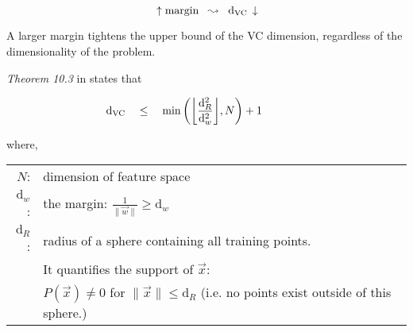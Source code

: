 \begin{frame}

\slidesonly{\vspace{-5mm}} 

\\

\slidesonly{\vspace{-5mm}} 

\begin{equation}
\, \uparrow \text{margin} \;\; \leadsto \;\; \mathrm{d}_{\mathrm{VC}} \, \downarrow   
\end{equation}


A larger margin tightens the upper bound of the VC dimension, regardless of the dimensionality of the problem. 

\begin{block}{\textit{Theorem 10.3} in \citep{Vapnik1998}}
states that

\begin{equation}
    \mathrm{d}_{\mathrm{VC}} \quad\leq\quad \min \bigg( \bigg\lfloor 
    \frac{\mathrm{d}_R^2}{\mathrm{d}_{{w}}^2}
\bigg\rfloor, N \bigg) + 1\qquad\qquad
\label{eq:dvcmarginbound}
\end{equation}

where,\\

\begin{tabular}{rl}
    $N$\;:& dimension of feature space \\[1mm]
    $\mathrm{d}_w$\;:& the margin: 
        $\frac{1}{\|\vec w \|} \geq \mathrm{d}_w$ \\[1mm]
    $\mathrm{d}_R$\;:& radius of a sphere containing all training points.\\
    &It quantifies the support of $\vec x$:\\
    & $P(\vec x) \neq 0$ for $\|\vec x\| \leq \mathrm{d}_R$ (i.e. no points exist outside of this sphere.)
\end{tabular}
\end{block}


\end{frame}


